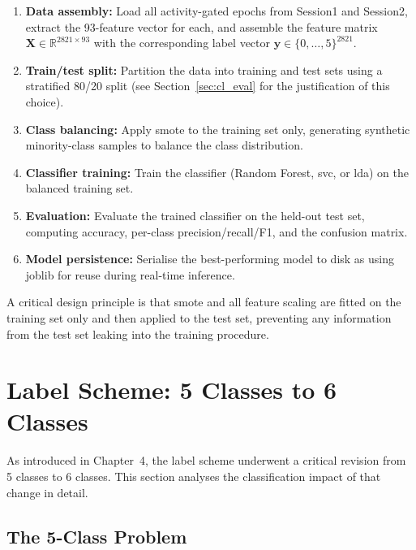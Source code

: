 \begin{enumerate}[leftmargin=*]
    \item \textbf{Data assembly:} Load all activity-gated epochs
    from Session1 and Session2, extract the 93-feature vector for
    each, and assemble the feature matrix
    $\mathbf{X} \in \mathbb{R}^{2821 \times 93}$ with the
    corresponding label vector $\mathbf{y} \in \{0,\ldots,5\}^{2821}$.
    \item \textbf{Train/test split:} Partition the data into
    training and test sets using a stratified 80/20 split (see
    Section~\ref{sec:cl_eval} for the justification of this choice).
    \item \textbf{Class balancing:} Apply \acrshort{smote} to the
    training set only, generating synthetic minority-class samples
    to balance the class distribution.
    \item \textbf{Classifier training:} Train the classifier
    (Random Forest, \acrshort{svc}, or \acrshort{lda}) on the
    balanced training set.
    \item \textbf{Evaluation:} Evaluate the trained classifier on
    the held-out test set, computing accuracy, per-class
    precision/recall/F1, and the confusion matrix.
    \item \textbf{Model persistence:} Serialise the best-performing
    model to disk as  using joblib
    for reuse during real-time inference.
\end{enumerate}

A critical design principle is that \acrshort{smote} and all
feature scaling are fitted on the training set only and then
applied to the test set, preventing any information from the test
set leaking into the training procedure.

\section{Label Scheme: 5 Classes to 6 Classes}
\label{sec:cl_labels}

As introduced in Chapter~4, the label scheme underwent a critical
revision from 5 classes to 6 classes. This section analyses the
classification impact of that change in detail.

\subsection{The 5-Class Problem}

